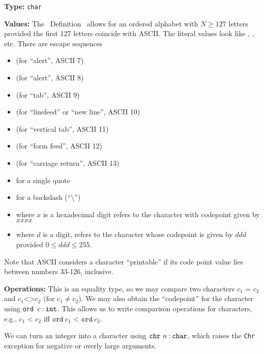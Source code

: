 \begin{node}
\begin{node}[Characters]\label{sml-000O}%
\textbf{Type:} \texttt{char}

\textbf{Values:} The \SML\ Definition~\cite[\S2.2]{milner1997definition}
allows for an ordered alphabet with $N\geq 127$ letters provided the
first 127 letters coincide with ASCII. The literal values look like
, , etc. There are escape sequences
\begin{itemize}
\item {} (for ``alert'', ASCII 7)
\item {} (for ``alert'', ASCII 8)
\item {} (for ``tab'', ASCII 9)
\item {} (for ``linefeed'' or ``new line'', ASCII 10)
\item {} (for ``vertical tab'', ASCII 11)
\item {} (for ``form feed'', ASCII 12)
\item {} (for ``carriage return'', ASCII 13)
\item {} for a single quote
\item \Char{\texttt{\textbackslash\textbackslash}} for a backslash (``\textbackslash'')
\item {} where $x$ is a hexadecimal
  digit refers to the character with codepoint given by $xxxx$
\item {} where $d$ is a digit, refers to the
  character whose codepoint is given by $ddd$ provided $0\leq ddd\leq255$.
\end{itemize}
Note that ASCII considers a character ``printable'' if its code point
value lies between numbers 33-126, inclusive.

\textbf{Operations:} This is an equality type, so we may compare two
characters $c_{1}\texttt{ = }c_{2}$ and $c_{1}\texttt{<>} c_{2}$ (for
$c_{1}\neq c_{2}$). We may also obtain the ``codepoint'' for the
character using \texttt{ord}~$c\mathbin{:}\texttt{int}$. This allows us to
write comparison operations for characters, e.g., $c_{1}\texttt{ < }c_{2}$
iff $\texttt{ord}~c_{1}\texttt{ < }\texttt{ord}~c_{2}$.

We can turn an integer into a character using $\texttt{chr}~n\mathbin{:}\texttt{char}$,
which raises the \texttt{Chr} exception for negative or overly large arguments.



\end{node}
\end{node}
